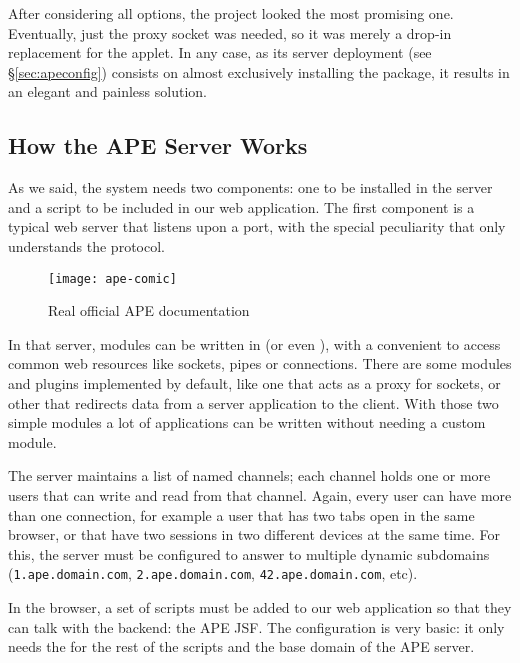 After considering all options, the  project looked the most promising one.
Eventually, just the proxy socket was needed, so it was merely a drop-in replacement for the  applet.
In any case, as its server deployment (see \S\ref{sec:apeconfig}) consists on almost exclusively installing the   package, it results in an elegant and painless solution.


\subsection{How the APE Server Works} %
\label{sub:how_the_ape_server_works}

As we said, the system needs two components: one to be installed in the server and a script to be included in our web application.
The first component is a typical web server that listens upon a port, with the special peculiarity that only understands the  protocol.

\begin{wrapfigure}{r}{0.5\textwidth}
  \centering
    \texttt{[image: ape-comic]}
  \caption{Real official APE documentation}
  \label{fig:ape-comic}
\end{wrapfigure}

In that server, modules can be written in  (or even ), with a convenient  to access common web resources like sockets, pipes or  connections.
There are some modules and plugins implemented by default, like one that acts as a proxy for  sockets, or other that redirects data from a server application to the client.
With those two simple modules a lot of applications can be written without needing a custom module.

The server maintains a list of named channels; each channel holds one or more users that can write and read from that channel.
Again, every user can have more than one connection, for example a user that has two tabs open in the same browser, or that have two sessions in two different devices at the same time.
For this, the server  must be configured to answer to multiple dynamic subdomains  (\verb|1.ape.domain.com|, \verb|2.ape.domain.com|, \verb|42.ape.domain.com|, etc).

In the browser, a set of scripts must be added to our web application so that they can talk with the backend: the \ac{APE} \ac{JSF}.
The configuration is very basic: it only needs the  for the rest of the scripts and the base domain of the \ac{APE} server.

